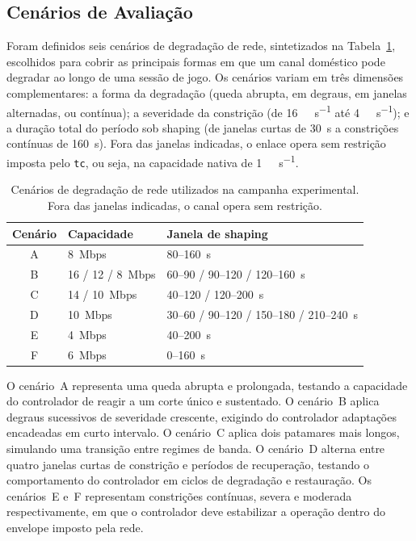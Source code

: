 \documentclass[conference]{IEEEtran}
\begin{document}
\subsection{Cenários de Avaliação}

Foram definidos seis cenários de degradação de rede,
sintetizados na Tabela~\ref{tab:scenarios}, escolhidos para
cobrir as principais formas em que um canal doméstico pode
degradar ao longo de uma sessão de jogo. Os cenários variam em
três dimensões complementares: a forma da degradação (queda
abrupta, em degraus, em janelas alternadas, ou contínua); a
severidade da constrição (de \SI{16}{\mega\bit\per\second}
até \SI{4}{\mega\bit\per\second}); e a duração total do
período sob shaping (de janelas curtas de \SI{30}{\second} a
constrições contínuas de \SI{160}{\second}). Fora das janelas
indicadas, o enlace opera sem restrição imposta pelo
\texttt{tc}, ou seja, na capacidade nativa de \SI{1}{\giga\bit\per\second}.

\begin{table}[!t]
  \caption{Cenários de degradação de rede utilizados na campanha
  experimental. Fora das janelas indicadas, o canal opera sem
  restrição.}
  \label{tab:scenarios}
  \centering
  \begin{tabular}{cll}
    \toprule
    \textbf{Cenário} & \textbf{Capacidade} & \textbf{Janela de shaping} \\
    \midrule
    A & 8~Mbps & 80--160~s \\
    B & 16 / 12 / 8~Mbps & 60--90 / 90--120 / 120--160~s \\
    C & 14 / 10~Mbps & 40--120 / 120--200~s \\
    D & 10~Mbps & 30--60 / 90--120 / 150--180 / 210--240~s \\
    E & 4~Mbps & 40--200~s \\
    F & 6~Mbps & 0--160~s \\
    \bottomrule
  \end{tabular}
\end{table}

O cenário~A representa uma queda abrupta e prolongada,
testando a capacidade do controlador de reagir a um corte
único e sustentado. O cenário~B aplica degraus sucessivos de
severidade crescente, exigindo do controlador adaptações
encadeadas em curto intervalo. O cenário~C aplica dois
patamares mais longos, simulando uma transição entre regimes
de banda. O cenário~D alterna entre quatro janelas curtas de
constrição e períodos de recuperação, testando o
comportamento do controlador em ciclos de degradação e
restauração. Os cenários~E e~F representam constrições
contínuas, severa e moderada respectivamente, em que o
controlador deve estabilizar a operação dentro do envelope
imposto pela rede.
\end{document}
